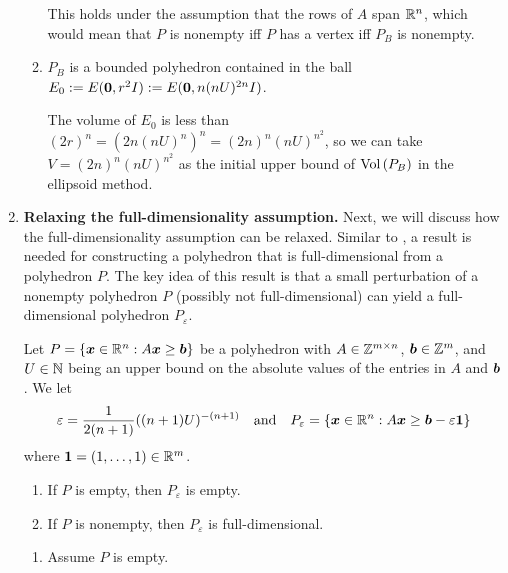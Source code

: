 \begin{enumerate}
\begin{enumerate}
\begin{note}
This holds under the assumption that the rows of \(A\) span \(\mathbb{R}^n\), which
would mean that \(P\) is nonempty iff \(P\) has a vertex iff \(P_{B}\) is
nonempty.
\end{note}
\item \(P_{B}\) is a bounded polyhedron contained in the ball
\(E_0:=E(\bm{0},r^{2}I):=E(\bm{0},n(nU)^{2n}I)\).

\begin{note}
The volume of \(E_0\) is less than
\((2r)^{n}=(2n(nU)^{n})^{n}=(2n)^{n}(nU)^{n^{2}}\), so we can take
\(V=(2n)^{n}(nU)^{n^{2}}\) as the initial upper bound of \(\operatorname{Vol}\left(P_B\right)\) in the
ellipsoid method.
\end{note}
\end{enumerate}
\item \label{it:relax-full-d-assum} \textbf{Relaxing the full-dimensionality assumption.}
Next, we will discuss how the full-dimensionality assumption can be relaxed.
Similar to , a result is needed for constructing
a polyhedron that is full-dimensional from a polyhedron \(P\). The key idea of
this result is that a small perturbation of a nonempty polyhedron \(P\)
(possibly not full-dimensional) can yield a full-dimensional polyhedron
\(P_{\varepsilon}\).
\begin{center}
\end{center}
\begin{proposition}
\label{prp:nonempty-small-perturb-full-d}
Let \(P=\{\bm{x}\in\mathbb{R}^n:A\bm{x}\ge\bm{b}\}\) be a polyhedron with
\(A\in\mathbb{Z}^{m\times n}\), \(\bm{b}\in \mathbb{Z}^{m}\), and \(U\in\mathbb{N}\) being an upper
bound on the absolute values of the entries in \(A\) and
\(\bm{b}\). We let
\[
\varepsilon=\frac{1}{2(n+1)}((n+1)U)^{-(n+1)}\quad\text{and}\quad
P_{\varepsilon}=\{\bm{x}\in\mathbb{R}^n:A\bm{x}\ge\bm{b}-\varepsilon\bm{1}\}
\]
where \(\bm{1}=(1,\dotsc,1)\in\mathbb{R}^m\).
\begin{enumerate}
\item If \(P\) is empty, then \(P_{\varepsilon}\) is empty.
\item If \(P\) is nonempty, then \(P_{\varepsilon}\) is full-dimensional.
\end{enumerate}
\end{proposition}
\begin{pf}
\begin{enumerate}
\item Assume \(P\) is empty.


\end{enumerate}
\end{pf}
\end{enumerate}
